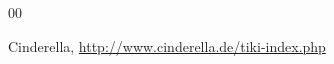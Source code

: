 \documentclass[11pt]{article}
\begin{document}
\begin{thebibliography}{00}
\setlength{\itemsep}{-1mm}
\footnotesize
{}
Cinderella, \url{http://www.cinderella.de/tiki-index.php}
\end{thebibliography}
\normalsize
\end{document}
